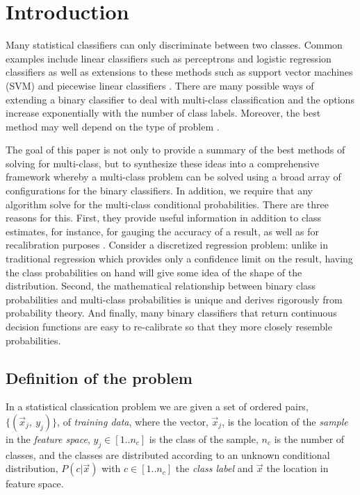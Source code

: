 \section{Introduction}

Many statistical classifiers can only discriminate between two classes.
Common examples include linear classifiers such as perceptrons and
logistic regression classifiers \citep{Michie_etal1994} as well as extensions
to these methods such as support vector machines (SVM) \citep{Mueller_etal2001} and 
piecewise linear classifiers \citep{Bagirov2005,Mills2018}.
There are many possible ways of extending a binary classifier to deal
with multi-class classification and the options increase exponentially
with the number of class labels.
Moreover, the best method may well depend on the type of problem
\citep{Dietterich_Bakiri1995,Allwein_etal2000}.

The goal of this paper is not only to provide a summary of the
best methods of solving for multi-class, but to synthesize
these ideas into a comprehensive framework whereby a multi-class problem
can be solved using a broad array of configurations for the binary
classifiers. 
In addition, we require that any algorithm solve 
for the multi-class conditional probabilities.
There are three reasons for this.
First, they provide useful information
in addition to class estimates,
for instance, for gauging the accuracy of a result, as well as for recalibration
purposes \citep{Mills2009}.
Consider a discretized regression problem: unlike in traditional regression
which provides only a confidence limit on the result,
having the class probabilities on hand will give some idea of the
shape of the distribution.
Second, the mathematical relationship between binary class
probabilities and multi-class probabilities is unique and
derives rigorously from probability theory.
And finally, many binary classifiers that return continuous decision functions
are easy to re-calibrate so that they more closely resemble probabilities.

\subsection{Definition of the problem}

\label{description}

In a statistical classication problem we are given a set of ordered pairs, 
$\lbrace (\vec x_j,~ y_j) \rbrace$, of {\it training data},
where the vector, $\vec x_j$, is the location of the {\it sample} in 
the {\it feature space},
$y_j \in [1..n_c]$ is the class of the sample,
$n_c$ is the number of classes,
and the classes are
distributed according to an unknown conditional distribution,
$P(c | \vec x)$ with $c \in [1..n_c]$ the {\it class label} and $\vec x$ the location
in feature space.

